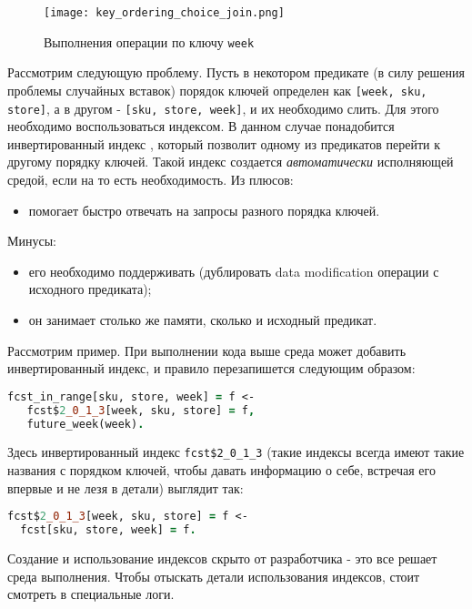 \begin{figure}
	\centering
	\texttt{[image: key\_ordering\_choice\_join.png]}
	\caption{Выполнения операции \join по ключу \lstinline{week}}
	\label{fig:optimization:key_ordering:key_ordering_choice_join}
\end{figure}

Рассмотрим следующую проблему. Пусть в некотором предикате (в силу решения проблемы случайных вставок) порядок ключей определен как \lstinline{[week, sku, store]}, а в другом - \lstinline{[sku, store, week]}, и их необходимо слить. Для этого необходимо воспользоваться индексом. В данном случае понадобится инвертированный индекс \cite{inverted_index}, который позволит одному из предикатов перейти к другому порядку ключей. Такой индекс создается \emph{автоматически} исполняющей средой, если на то есть необходимость. Из плюсов:

\begin{itemize}
  \item помогает быстро отвечать на запросы разного порядка ключей.
\end{itemize}

Минусы:

\begin{itemize}
  \item его необходимо поддерживать (дублировать data modification операции с исходного предиката);
  \item он занимает столько же памяти, сколько и исходный предикат.
\end{itemize}

Рассмотрим пример. При выполнении кода выше среда может добавить инвертированный индекс, и правило перезапишется следующим образом:

\begin{lstlisting}[language=Prolog]
fcst_in_range[sku, store, week] = f <-
   fcst$2_0_1_3[week, sku, store] = f,
   future_week(week).
\end{lstlisting}

Здесь инвертированный индекс \lstinline{fcst$2_0_1_3} (такие индексы всегда имеют такие названия с порядком ключей, чтобы давать информацию о себе, встречая его впервые и не лезя в детали) выглядит так:

\begin{lstlisting}[language=Prolog]
fcst$2_0_1_3[week, sku, store] = f <-
  fcst[sku, store, week] = f.
\end{lstlisting}

Создание и использование индексов скрыто от разработчика - это все решает среда выполнения. Чтобы отыскать детали использования индексов, стоит смотреть в специальные логи.


